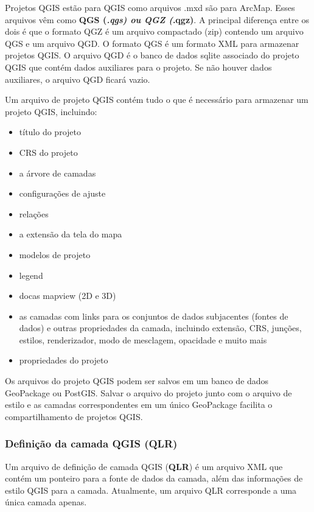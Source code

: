 \documentclass[
]{book}
\providecommand{\tightlist}{%
  \setlength{\itemsep}{0pt}\setlength{\parskip}{0pt}}
\begin{document}
Projetos QGIS estão para QGIS como arquivos .mxd são para ArcMap. Esses arquivos vêm como \textbf{QGS (\emph{.qgs)\textbf{ ou }QGZ (}.qgz)}. A principal diferença entre os dois é que o formato QGZ é um arquivo compactado (zip) contendo um arquivo QGS e um arquivo QGD. O formato QGS é um formato XML para armazenar projetos QGIS. O arquivo QGD é o banco de dados sqlite associado do projeto QGIS que contém dados auxiliares para o projeto. Se não houver dados auxiliares, o arquivo QGD ficará vazio.

Um arquivo de projeto QGIS contém tudo o que é necessário para armazenar um projeto QGIS, incluindo:

\begin{itemize}
\tightlist
\item
  título do projeto
\item
  CRS do projeto
\item
  a árvore de camadas
\item
  configurações de ajuste
\item
  relações
\item
  a extensão da tela do mapa
\item
  modelos de projeto
\item
  legend
\item
  docas mapview (2D e 3D)
\item
  as camadas com links para os conjuntos de dados subjacentes (fontes de dados) e outras propriedades da camada, incluindo extensão, CRS, junções, estilos, renderizador, modo de mesclagem, opacidade e muito mais
\item
  propriedades do projeto
\end{itemize}

Os arquivos do projeto QGIS podem ser salvos em um banco de dados GeoPackage ou PostGIS. Salvar o arquivo do projeto junto com o arquivo de estilo e as camadas correspondentes em um único GeoPackage facilita o compartilhamento de projetos QGIS.

\hypertarget{definiuxe7uxe3o-da-camada-qgis-qlr}{%
\subsubsection{\texorpdfstring{\textbf{Definição da camada QGIS (QLR)}}{Definição da camada QGIS (QLR)}}\label{definiuxe7uxe3o-da-camada-qgis-qlr}}

Um arquivo de definição de camada QGIS (\textbf{QLR}) é um arquivo XML que contém um ponteiro para a fonte de dados da camada, além das informações de estilo QGIS para a camada. Atualmente, um arquivo QLR corresponde a uma única camada apenas.
\end{document}
